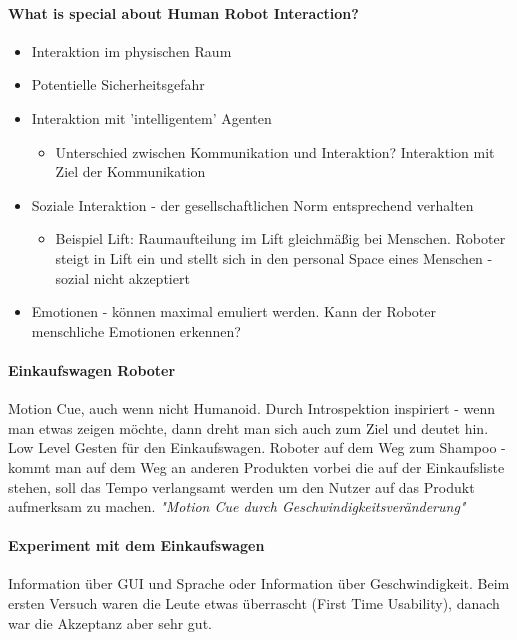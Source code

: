 \paragraph{What is special about Human Robot Interaction?}

\begin{itemize}
\item Interaktion im physischen Raum
\item Potentielle Sicherheitsgefahr
\item Interaktion mit 'intelligentem' Agenten
	\begin{itemize}
	\item{Unterschied zwischen Kommunikation und Interaktion? Interaktion mit Ziel der
	Kommunikation}
	\end{itemize}
\item Soziale Interaktion - der gesellschaftlichen Norm entsprechend verhalten
	\begin{itemize}
	\item{Beispiel Lift: Raumaufteilung im Lift gleichmäßig bei Menschen. Roboter
	steigt in Lift ein und stellt sich in den personal Space eines Menschen - sozial nicht
	akzeptiert}
	\end{itemize}
\item{Emotionen - können maximal emuliert werden. Kann der Roboter menschliche Emotionen
erkennen?}
\end{itemize}

\paragraph{Einkaufswagen Roboter}

Motion Cue, auch wenn nicht Humanoid. Durch Introspektion inspiriert - wenn man etwas
zeigen möchte, dann dreht man sich auch zum Ziel und deutet hin. 
Low Level Gesten für den Einkaufswagen. 
Roboter auf dem Weg zum Shampoo - kommt man auf dem Weg an anderen Produkten vorbei die
auf der Einkaufsliste stehen, soll das Tempo verlangsamt werden um den Nutzer auf das
Produkt aufmerksam zu machen.
\textit{"Motion Cue durch Geschwindigkeitsveränderung"}

\paragraph{Experiment mit dem Einkaufswagen}
Information über GUI und Sprache oder Information über Geschwindigkeit. 
Beim ersten Versuch waren die Leute etwas überrascht (First Time Usability), danach
war die Akzeptanz aber sehr gut.

